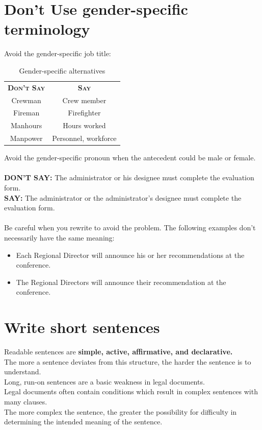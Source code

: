 \documentclass[12pt, letterpaper]{report}
\begin{document}
\begin{linenumbers}
    \section{Don't Use gender-specific terminology}
    Avoid the gender-specific job title:\\
    \begin{table}[h]
        \centering
        \begin{tabular}{c|c}
           \textsc{\textbf{Don't Say}}  &  \textsc{\textbf{Say}}\\
            Crewman & Crew member\\
            Fireman & Firefighter\\
            Manhours & Hours worked\\
            Manpower & Personnel, workforce
        \end{tabular}
        \caption{Gender-specific alternatives}
        \label{tab:genderalts}
    \end{table}
    Avoid the gender-specific pronoun when the antecedent could be male or female.\\\\
    \textbf{DON'T SAY: }The administrator or his designee must complete the evaluation form.\\
    \textbf{SAY: }The administrator or the administrator's designee must complete the evaluation form.\\\\
    Be careful when you rewrite to avoid the problem. The following examples don't necessarily have the same meaning:
\begin{itemize}
    \item Each Regional Director will announce his or her recommendations at the conference.
    \item The Regional Directors will announce their recommendation at the conference.
\end{itemize}
    \section{Write short sentences}
    Readable sentences are \textbf{simple, active, affirmative, and declarative.}\\
The more a sentence deviates from this structure, the harder the sentence is to understand.\\
Long, run-on sentences are a basic weakness in legal documents.\\
Legal documents often contain conditions which result in complex sentences with many clauses.\\
The more complex the sentence, the greater the possibility for difficulty in determining the intended meaning of the sentence. 

\end{linenumbers}
\end{document}
